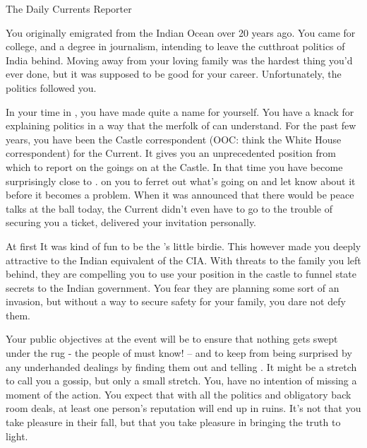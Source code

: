 \documentclass[char]{NeptuneBall}
\begin{document}
\name{\cReporter{}}

The Daily Currents Reporter

You originally emigrated from the Indian Ocean over 20 years ago. You came for college, and a degree in journalism, intending to leave the cutthroat politics of India behind. Moving away from your loving family was the hardest thing you'd ever done, but it was supposed to be good for your career. Unfortunately, the politics followed you.

In your time in \pAtlantis{}, you have made quite a name for yourself. You have a knack for explaining politics in a way that the merfolk of \pAtlantis{} can understand. For the past few years, you have been the Castle correspondent (OOC: think the White House correspondent) for the Current. It gives you an unprecedented position from which to report on the goings on at the Castle. In that time you have become surprisingly close to \cKing{\King} \cKing{}. \cKing{\They}  on you to ferret out what's going on and let \cKing{\them} know about it before it becomes a problem.  When it was announced that there would be peace talks at the ball today, the Current didn't even have to go to the trouble of securing you a ticket, \cKing{\King} \cKing{} delivered your invitation personally.

At first It was kind of fun to be the \cKing{\King}'s little birdie. This however made you deeply attractive to the Indian equivalent of the CIA. With threats to the family you left behind, they are compelling you to use your position in the castle to funnel state secrets to the Indian government. You fear they are planning some sort of an invasion, but without a way to secure safety for your family, you dare not defy them.

Your public objectives at the event will be to ensure that nothing gets swept under the rug - the people of \pAtlantis{} must know! -- and to keep \cKing{\King} \cKing{} from being surprised by any underhanded dealings by finding them out and telling \cKing{\them}. It might be a stretch to call you a gossip, but only a small stretch. You, have no intention of missing a moment of the action. You expect that with all the politics and obligatory back room deals, at least one person’s reputation will end up in ruins. It's not that you take pleasure in their fall, but that you take pleasure in bringing the truth to light.
\end{document}
